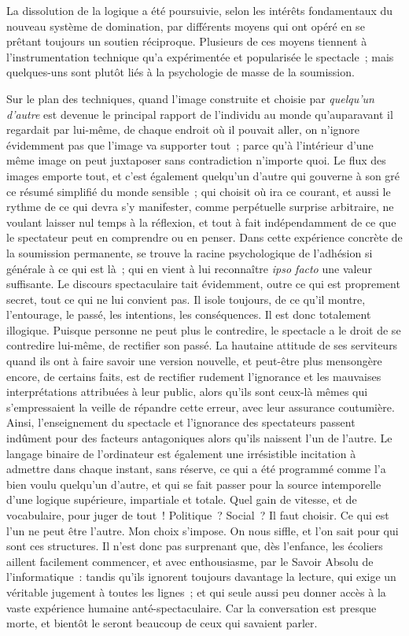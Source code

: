 \documentclass[french,twoside]{book} %
\begin{document}
\noindent La dissolution de la logique a été poursuivie, selon les intérêts fondamentaux du nouveau système de domination, par différents moyens qui ont opéré en se prêtant toujours un soutien réciproque. Plusieurs de ces moyens tiennent à l’instrumentation technique qu’a expérimentée et popularisée le spectacle ; mais quelques-uns sont plutôt liés à la psychologie de masse de la soumission.\par
Sur le plan des techniques, quand l’image construite et choisie par \emph{quelqu’un d’autre} est devenue le principal rapport de l’individu au monde qu’auparavant il regardait par lui-même, de chaque endroit où il pouvait aller, on n’ignore évidemment pas que l’image va supporter tout ; parce qu’à l’intérieur d’une même image on peut juxtaposer sans contradiction n’importe quoi. Le flux des images emporte tout, et c’est également quelqu’un d’autre qui gouverne à son gré ce résumé simplifié du monde sensible ; qui choisit où ira ce courant, et aussi le rythme de ce qui devra s’y manifester, comme perpétuelle surprise arbitraire, ne voulant laisser nul temps à la réflexion, et tout à fait indépendamment de ce que le spectateur peut en comprendre ou en penser. Dans cette expérience concrète de la soumission permanente, se trouve la racine psychologique de l’adhésion si générale à ce qui est là ; qui en vient à lui reconnaître \emph{ipso facto} une valeur suffisante. Le discours spectaculaire tait évidemment, outre ce qui est proprement secret, tout ce qui ne lui convient pas. Il isole toujours, de ce qu’il montre, l’entourage, le passé, les intentions, les conséquences. Il est donc totalement illogique. Puisque personne ne peut plus le contredire, le spectacle a le droit de se contredire lui-même, de rectifier son passé. La hautaine attitude de ses serviteurs quand ils ont à faire savoir une version nouvelle, et peut-être plus mensongère encore, de certains faits, est de rectifier rudement l’ignorance et les mauvaises interprétations attribuées à leur public, alors qu’ils sont ceux-là mêmes qui s’empressaient la veille de répandre cette erreur, avec leur assurance coutumière. Ainsi, l’enseignement du spectacle et l’ignorance des spectateurs passent indûment pour des facteurs antagoniques alors qu’ils naissent l’un de l’autre. Le langage binaire de l’ordinateur est également une irrésistible incitation à admettre dans chaque instant, sans réserve, ce qui a été programmé comme l’a bien voulu quelqu’un d’autre, et qui se fait passer pour la source intemporelle d’une logique supérieure, impartiale et totale. Quel gain de vitesse, et de vocabulaire, pour juger de tout ! Politique ? Social ? Il faut choisir. Ce qui est l’un ne peut être l’autre. Mon choix s’impose. On nous siffle, et l’on sait pour qui sont ces structures. Il n’est donc pas surprenant que, dès l’enfance, les écoliers aillent facilement commencer, et avec enthousiasme, par le Savoir Absolu de l’informatique : tandis qu’ils ignorent toujours davantage la lecture, qui exige un véritable jugement à toutes les lignes ; et qui seule aussi peu donner accès à la vaste expérience humaine anté-spectaculaire. Car la conversation est presque morte, et bientôt le seront beaucoup de ceux qui savaient parler.\par
\end{document}
